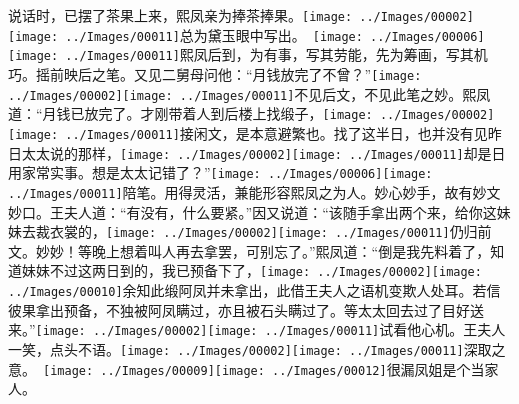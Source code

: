说话时，已摆了茶果上来，熙凤亲为捧茶捧果。{{\texttt{[image: ../Images/00002]}\texttt{[image: ../Images/00011]}\footnotesize \kaishu 总为黛玉眼中写出。　}\texttt{[image: ../Images/00006]}\texttt{[image: ../Images/00011]}\footnotesize \kaishu 熙凤后到，为有事，写其劳能，先为筹画，写其机巧。摇前映后之笔。}又见二舅母问他：``月钱放完了不曾？''{\texttt{[image: ../Images/00002]}\texttt{[image: ../Images/00011]}\footnotesize \kaishu 不见后文，不见此笔之妙。}熙凤道：``月钱已放完了。才刚带着人到后楼上找缎子，{\texttt{[image: ../Images/00002]}\texttt{[image: ../Images/00011]}\footnotesize \kaishu 接闲文，是本意避繁也。}找了这半日，也并没有见昨日太太说的那样，{\texttt{[image: ../Images/00002]}\texttt{[image: ../Images/00011]}\footnotesize \kaishu 却是日用家常实事。}想是太太记错了？''{\texttt{[image: ../Images/00006]}\texttt{[image: ../Images/00011]}\footnotesize \kaishu 陪笔。用得灵活，兼能形容熙凤之为人。妙心妙手，故有妙文妙口。}王夫人道：``有没有，什么要紧。''因又说道：``该随手拿出两个来，给你这妹妹去裁衣裳的，{\texttt{[image: ../Images/00002]}\texttt{[image: ../Images/00011]}\footnotesize \kaishu 仍归前文。妙妙！}等晚上想着叫人再去拿罢，可别忘了。''熙凤道：``倒是我先料着了，知道妹妹不过这两日到的，我已预备下了，{\texttt{[image: ../Images/00002]}\texttt{[image: ../Images/00010]}\footnotesize \kaishu 余知此缎阿凤并未拿出，此借王夫人之语机变欺人处耳。若信彼果拿出预备，不独被阿凤瞒过，亦且被石头瞒过了。}等太太回去过了目好送来。''{\texttt{[image: ../Images/00002]}\texttt{[image: ../Images/00011]}\footnotesize \kaishu 试看他心机。}王夫人一笑，点头不语。{{\texttt{[image: ../Images/00002]}\texttt{[image: ../Images/00011]}\footnotesize \kaishu 深取之意。　}\texttt{[image: ../Images/00009]}\texttt{[image: ../Images/00012]}\footnotesize \kaishu 很漏凤姐是个当家人。}

